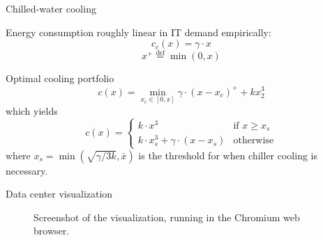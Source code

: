 \documentclass[xcolor=dvipsnames]{beamer}
\newcommand{\eqdef}{\ensuremath{\overset{\mathrm{def}}{=}}}
\begin{document}
\begin{frame}{Chilled-water cooling}

Energy consumption roughly linear in IT demand empirically: 
\begin{equation}
c_c(x) = \gamma \cdot x
\end{equation}
\begin{equation}
	x^+ \eqdef \min(0, x)
\end{equation}

\begin{block}{Optimal cooling portfolio}
\begin{equation}
c(x) = \min_{x_c \in [0,x]} \gamma \cdot (x-x_c)^+ + kx_2^3
\end{equation}
which yields
$$
c(x) = \left\{ \begin{array}{ll}
	k \cdot x^3 & \mbox{if $x \geq x_s$}\\
	k \cdot x_s^3 + \gamma \cdot (x-x_s) & \mbox{otherwise}\end{array} \right.
$$
where $x_s = \min \left(\sqrt{\gamma/3k}, \bar{x}\right)$ is the threshold for when chiller cooling is necessary.

\end{block}
\end{frame}


\begin{frame}{Data center visualization}

\begin{figure}
\centering
{}
\caption{Screenshot of the visualization, running in the Chromium web browser.}
\end{figure}

\end{frame}
\end{document}
